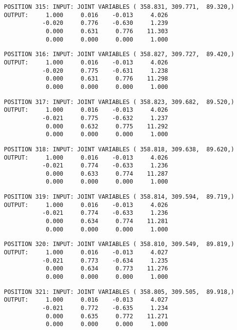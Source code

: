 \begin{verbatim}
POSITION 315: INPUT: JOINT VARIABLES ( 358.831, 309.771,  89.320,)
OUTPUT:     1.000     0.016    -0.013     4.026
           -0.020     0.776    -0.630     1.239
            0.000     0.631     0.776    11.303
            0.000     0.000     0.000     1.000
\end{verbatim} \pagebreak[1]\begin{verbatim}
POSITION 316: INPUT: JOINT VARIABLES ( 358.827, 309.727,  89.420,)
OUTPUT:     1.000     0.016    -0.013     4.026
           -0.020     0.775    -0.631     1.238
            0.000     0.631     0.776    11.298
            0.000     0.000     0.000     1.000
\end{verbatim} \pagebreak[1]\begin{verbatim}
POSITION 317: INPUT: JOINT VARIABLES ( 358.823, 309.682,  89.520,)
OUTPUT:     1.000     0.016    -0.013     4.026
           -0.021     0.775    -0.632     1.237
            0.000     0.632     0.775    11.292
            0.000     0.000     0.000     1.000
\end{verbatim} \pagebreak[1]\begin{verbatim}
POSITION 318: INPUT: JOINT VARIABLES ( 358.818, 309.638,  89.620,)
OUTPUT:     1.000     0.016    -0.013     4.026
           -0.021     0.774    -0.633     1.236
            0.000     0.633     0.774    11.287
            0.000     0.000     0.000     1.000
\end{verbatim} \pagebreak[1]\begin{verbatim}
POSITION 319: INPUT: JOINT VARIABLES ( 358.814, 309.594,  89.719,)
OUTPUT:     1.000     0.016    -0.013     4.026
           -0.021     0.774    -0.633     1.236
            0.000     0.634     0.774    11.281
            0.000     0.000     0.000     1.000
\end{verbatim} \pagebreak[1]\begin{verbatim}
POSITION 320: INPUT: JOINT VARIABLES ( 358.810, 309.549,  89.819,)
OUTPUT:     1.000     0.016    -0.013     4.027
           -0.021     0.773    -0.634     1.235
            0.000     0.634     0.773    11.276
            0.000     0.000     0.000     1.000
\end{verbatim} \pagebreak[1]\begin{verbatim}
POSITION 321: INPUT: JOINT VARIABLES ( 358.805, 309.505,  89.918,)
OUTPUT:     1.000     0.016    -0.013     4.027
           -0.021     0.772    -0.635     1.234
            0.000     0.635     0.772    11.271
            0.000     0.000     0.000     1.000
\end{verbatim} \pagebreak[1]\begin{verbatim}

\end{verbatim}
